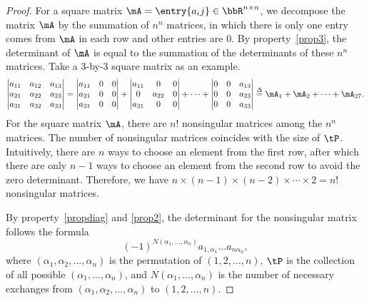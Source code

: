 \documentclass[11pt]{article}
\theoremstyle{plain}
\theoremstyle{definition}
\begin{document}
\begin{proof}
	For a square matrix $\mA = \entry{a_ij} \in \bbR^{n \times n}$, we decompose the  matrix $\mA$ by the summation of $n^n$ matrices, in which there is only one entry comes from $\mA$ in each row and other entries are 0. By property~\ref{prop3}, the determinant of $\mA$ is equal to the summation of the determinants of these $n^n$ matrices. Take a 3-by-3 square matrix as an example.
	\begin{align}
		\begin{vmatrix}
			a_{11} & a_{12} & a_{13}\\
			a_{21} & a_{22} & a_{23}\\
			a_{31} & a_{32} & a_{33}
		\end{vmatrix} = \begin{vmatrix}
			a_{11} & 0& 0\\
			a_{21} & 0 & 0\\
			a_{31} &0 & 0
		\end{vmatrix} + \begin{vmatrix}
			a_{11} & 0& 0\\
			0 & a_{22} & 0\\
			a_{31} &0 & 0
		\end{vmatrix} + \cdots +\begin{vmatrix}
			0 & 0& a_{13}\\
			0& 0 & a_{23}\\
			 0&0 & a_{33}
		\end{vmatrix} \overset{\Delta}{=} \mA_1 + \mA_2 +\cdots + \mA_{27}.
	\end{align}
	For the square matrix $\mA$,  there are $n!$ nonsingular matrices among the $n^n$ matrices. The number of nonsingular matrices coincides with the size of $\tP$. Intuitively, there are $n$ ways to choose an element from the first row, after which there are only $n-1$ ways to choose an element from the second row to avoid the zero determinant. Therefore, we have $n \times (n-1) \times (n-2) \times \cdots \times 2 = n!$ nonsingular matrices.
	
	By property~\ref{propdiag} and \ref{prop2}, the determinant for the nonsingular matrix follows the formula \[(-1)^{N(\alpha_1,...,\alpha_n)}  a_{1,\alpha_1} ... a_{n \alpha_n},\]
	where $(\alpha_1, \alpha_2, ...,\alpha_n)$ is the permutation of $(1,2,...,n)$, $\tP$ is the collection of all possible  $(\alpha_1,...,\alpha_n)$, and $N(\alpha_1,...,\alpha_n)$ is the number of necessary exchanges from $(\alpha_1,\alpha_2,...,\alpha_n)$  to $(1,2,...,n)$. 
\end{proof}
\end{document}
